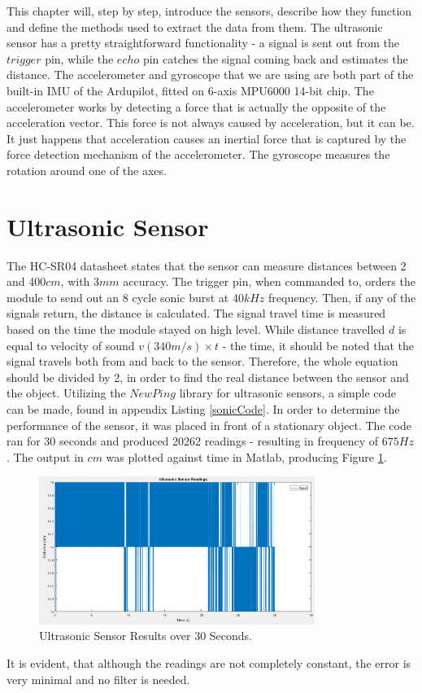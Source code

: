 This chapter will, step by step, introduce the sensors, describe how they function and define the methods used to extract the data from them. The ultrasonic sensor has a pretty straightforward functionality - a signal is sent out from the $trigger$ pin, while the $echo$ pin catches the signal coming back and estimates the distance. The accelerometer and gyroscope that we are using are both part of the built-in IMU of the Ardupilot, fitted on 6-axis MPU6000 14-bit chip. The accelerometer works by detecting a force that is actually the opposite of the acceleration vector. This force is not always caused by acceleration, but it can be. It just happens that acceleration causes an inertial force that is captured by the force detection mechanism of the accelerometer. The gyroscope measures the rotation around one of the axes.

\section{Ultrasonic Sensor}
The HC-SR04 datasheet\cite{HCDatasheet} states that the sensor can measure distances between 2 and 400$cm$, with 3$mm$ accuracy. The trigger pin, when commanded to, orders the module to send out an 8 cycle sonic burst at 40$kHz$ frequency. Then, if any of the signals return, the distance is calculated. The signal travel time is measured based on the time the module stayed on high level. While distance travelled $d$ is equal to velocity of sound $v (340m/s) \times t$ - the time, it should be noted that the signal travels both from and back to the sensor. Therefore, the whole equation should be divided by 2, in order to find the real distance between the sensor and the object.
Utilizing the $NewPing$ library for ultrasonic sensors, a simple code can be made, found in appendix Listing \ref{sonicCode}.
In order to determine the performance of the sensor, it was placed in front of a stationary object. The code ran for 30 seconds and produced 20262 readings - resulting in frequency of $675Hz$. The output in $cm$ was plotted against time in Matlab, producing Figure \ref{sonicPlot}.
\begin{figure}[H]
  \centering
    \includegraphics[width=0.8\textwidth]{images/sonicPlot.png}
	\caption{Ultrasonic Sensor Results over 30 Seconds.}
	\label{sonicPlot}
\end{figure} 
It is evident, that although the readings are not completely constant, the error is very minimal and no filter is needed.

